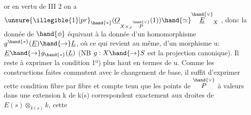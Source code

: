  or en vertu de III 2 on a $\unsure{\illegible{1}|pr}_{\hand{*}}(\underline{O}_{X\times_S\overset{\hand{\vee}}{P}}(1))\hand{\simeq}\overset{\hand{\vee}}{\underline{E}}_X$ , donc
la donnée de $\hand{\phi}$ équivaut à  la donnée d'un homomorphisme $g^{\hand{*}}(\underline{E})\hand{\to}\underline{L}$,
où ce qui revient au même, d'un morphisme u: $\underline{E}\hand{\to} g_{\hand{*}}(\underline{L})$ (NB $g:X\hand{\to} S$ est
la projection canonique). Il reste à exprimer la condition 1º) plus
haut en termes de u. Comme les constructions faites commutent avec le
changement de base, il suffit d'exprimer cette condition fibre par fibre\hand{,}
et compte tenu que les points de $\overset{\hand{\vee}}{P}$ à valeurs dans une extension k de
k(s) correspondent exactement aux droites de $E(s)\otimes_{k(s)}k$, cette

